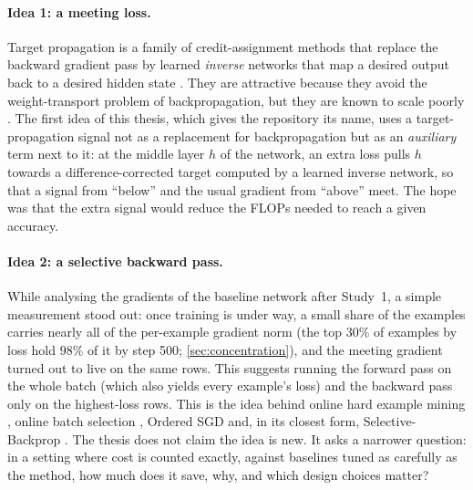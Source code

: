 \paragraph{Idea 1: a meeting loss.}
Target propagation is a family of credit-assignment methods that replace the backward gradient pass by learned \emph{inverse} networks that map a desired output back to a desired hidden state \citep{bengio2014auto,lee2015dtp}. They are attractive because they avoid the weight-transport problem of backpropagation, but they are known to scale poorly \citep{bartunov2018assessing,meulemans2020theoretical}. The first idea of this thesis, which gives the repository its name, uses a target-propagation signal not as a replacement for backpropagation but as an \emph{auxiliary} term next to it: at the middle layer $h$ of the network, an extra loss pulls $h$ towards a difference-corrected target computed by a learned inverse network, so that a signal from ``below'' and the usual gradient from ``above'' meet. The hope was that the extra signal would reduce the FLOPs needed to reach a given accuracy.

\paragraph{Idea 2: a selective backward pass.}
While analysing the gradients of the baseline network after Study~1, a simple measurement stood out: once training is under way, a small share of the examples carries nearly all of the per-example gradient norm (the top $30\%$ of examples by loss hold $98\%$ of it by step 500; \cref{sec:concentration}), and the meeting gradient turned out to live on the same rows. This suggests running the forward pass on the whole batch (which also yields every example's loss) and the backward pass only on the highest-loss rows. This is the idea behind online hard example mining \citep{shrivastava2016ohem}, online batch selection \citep{loshchilov2016online}, Ordered SGD \citep{kawaguchi2020ordered} and, in its closest form, Selective-Backprop \citep{jiang2019selective}. The thesis does not claim the idea is new. It asks a narrower question: in a setting where cost is counted exactly, against baselines tuned as carefully as the method, how much does it save, why, and which design choices matter?

